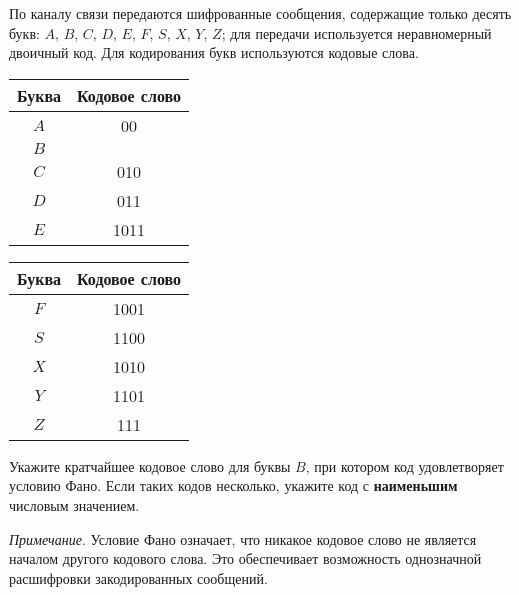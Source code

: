 \documentclass[14pt,a4paper]{article}
\begin{document}
По каналу связи передаются шифрованные сообщения, содержащие только
десять букв: $A$, $B$, $C$, $D$, $E$, $F$, $S$, $X$, $Y$, $Z$; для
передачи используется неравномерный двоичный код. Для кодирования
букв используются кодовые слова.

\begin{center}
	\begin{tabular}{|c|c|}
		\hline
		\textbf{Буква} & \textbf{Кодовое слово} \\ \hline
		$A$        & 00                     \\ \hline
		$B$        &                        \\ \hline
		$C$        & 010                    \\ \hline
		$D$        & 011                    \\ \hline
		$E$        & 1011                   \\ \hline
	\end{tabular}
	\quad
	\begin{tabular}{|c|c|}
		\hline
		\textbf{Буква} & \textbf{Кодовое слово} \\ \hline
		$F$        & 1001                   \\ \hline
		$S$        & 1100                   \\ \hline
		$X$        & 1010                   \\ \hline
		$Y$        & 1101                   \\ \hline
		$Z$        & 111                    \\ \hline
	\end{tabular}
\end{center}

Укажите кратчайшее кодовое слово для буквы $B$, при котором код
удовлетворяет условию Фано. Если таких кодов несколько, укажите код с
\textbf{наименьшим} числовым значением.

\textit{Примечание}. Условие Фано означает, что никакое кодовое слово
не является началом другого кодового слова. Это обеспечивает
возможность однозначной расшифровки закодированных сообщений.
\end{document}
